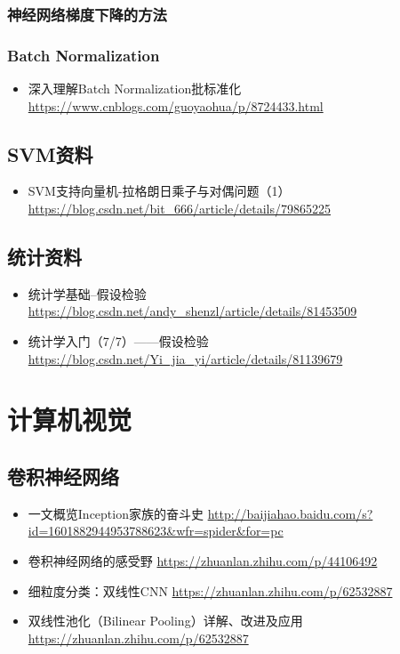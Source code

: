 \documentclass[11pt]{article}
\begin{document}
\subsubsection{神经网络梯度下降的方法}
\label{sec-3-3-2}

\subsubsection{Batch Normalization}
\label{sec-3-3-3}
\begin{itemize}
\item 深入理解Batch Normalization批标准化 \url{https://www.cnblogs.com/guoyaohua/p/8724433.html}
\end{itemize}

\subsection{SVM资料}
\label{sec-3-4}
\begin{itemize}
\item SVM支持向量机-拉格朗日乘子与对偶问题（1）\url{https://blog.csdn.net/bit_666/article/details/79865225}
\end{itemize}

\subsection{统计资料}
\label{sec-3-5}
\begin{itemize}
\item 统计学基础--假设检验 \url{https://blog.csdn.net/andy_shenzl/article/details/81453509}
\item 统计学入门（7/7）——假设检验 \url{https://blog.csdn.net/Yi_jia_yi/article/details/81139679}
\end{itemize}

\section{计算机视觉}
\label{sec-4}

\subsection{卷积神经网络}
\label{sec-4-1}
\begin{itemize}
\item 一文概览Inception家族的奋斗史 \url{http://baijiahao.baidu.com/s?id=1601882944953788623&wfr=spider&for=pc}
\item 卷积神经网络的感受野 \url{https://zhuanlan.zhihu.com/p/44106492}
\item 细粒度分类：双线性CNN \url{https://zhuanlan.zhihu.com/p/62532887}
\item 双线性池化（Bilinear Pooling）详解、改进及应用 \url{https://zhuanlan.zhihu.com/p/62532887}
\end{itemize}
\end{document}
